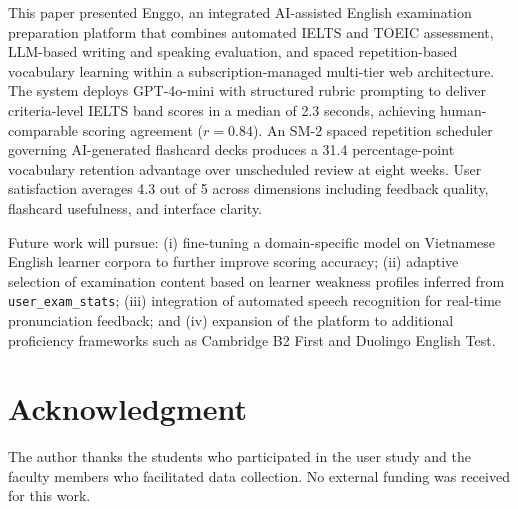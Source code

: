 \documentclass[conference]{IEEEtran}
\begin{document}
This paper presented Enggo, an integrated AI-assisted English examination preparation platform that combines automated IELTS and TOEIC assessment, LLM-based writing and speaking evaluation, and spaced repetition-based vocabulary learning within a subscription-managed multi-tier web architecture. The system deploys GPT-4o-mini with structured rubric prompting to deliver criteria-level IELTS band scores in a median of 2.3 seconds, achieving human-comparable scoring agreement ($r = 0.84$). An SM-2 spaced repetition scheduler governing AI-generated flashcard decks produces a 31.4 percentage-point vocabulary retention advantage over unscheduled review at eight weeks. User satisfaction averages 4.3 out of 5 across dimensions including feedback quality, flashcard usefulness, and interface clarity.

Future work will pursue: (i) fine-tuning a domain-specific model on Vietnamese English learner corpora to further improve scoring accuracy; (ii) adaptive selection of examination content based on learner weakness profiles inferred from \texttt{user\_exam\_stats}; (iii) integration of automated speech recognition for real-time pronunciation feedback; and (iv) expansion of the platform to additional proficiency frameworks such as Cambridge B2 First and Duolingo English Test.

\section*{Acknowledgment}
The author thanks the students who participated in the user study and the faculty members who facilitated data collection. No external funding was received for this work.
\end{document}

